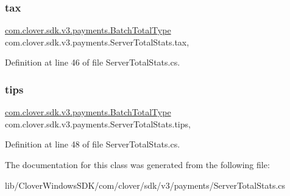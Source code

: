 \subsubsection{\texorpdfstring{tax}{tax}}
{\footnotesize\ttfamily \hyperlink{classcom_1_1clover_1_1sdk_1_1v3_1_1payments_1_1_batch_total_type}{com.\+clover.\+sdk.\+v3.\+payments.\+Batch\+Total\+Type} com.\+clover.\+sdk.\+v3.\+payments.\+Server\+Total\+Stats.\+tax\hspace{0.3cm}{\ttfamily [get]}, {\ttfamily [set]}}



Definition at line 46 of file Server\+Total\+Stats.\+cs.

\mbox{\label{classcom_1_1clover_1_1sdk_1_1v3_1_1payments_1_1_server_total_stats_aec31033b6435c633fdf3a88e55b3b6ff}} 
\subsubsection{\texorpdfstring{tips}{tips}}
{\footnotesize\ttfamily \hyperlink{classcom_1_1clover_1_1sdk_1_1v3_1_1payments_1_1_batch_total_type}{com.\+clover.\+sdk.\+v3.\+payments.\+Batch\+Total\+Type} com.\+clover.\+sdk.\+v3.\+payments.\+Server\+Total\+Stats.\+tips\hspace{0.3cm}{\ttfamily [get]}, {\ttfamily [set]}}



Definition at line 48 of file Server\+Total\+Stats.\+cs.



The documentation for this class was generated from the following file\+:\begin{DoxyCompactItemize}
\item 
lib/\+Clover\+Windows\+S\+D\+K/com/clover/sdk/v3/payments/Server\+Total\+Stats.\+cs\end{DoxyCompactItemize}
